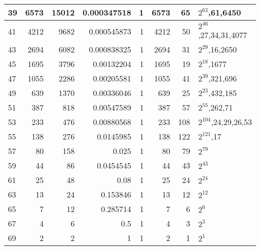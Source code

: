 \documentclass[10pt,a4paper]{standalone}
\begin{document}
\begin{tabular}{l|r|r|r|r|r|r|l|}
39 & 6573 & 15012 & 0.000347518 & 1 & 6573 & 65 & $2^{63}$,61,6450 \\ \hline
41 & 4212 & 9682 & 0.000545873 & 1 & 4212 & 50 & $2^{46}$,27,34,31,4077 \\ \hline
43 & 2694 & 6082 & 0.000838325 & 1 & 2694 & 31 & $2^{29}$,16,2650 \\ \hline
45 & 1695 & 3796 & 0.00132204 & 1 & 1695 & 19 & $2^{18}$,1677 \\ \hline
47 & 1055 & 2286 & 0.00205581 & 1 & 1055 & 41 & $2^{39}$,321,696 \\ \hline
49 & 639 & 1370 & 0.00336046 & 1 & 639 & 25 & $2^{23}$,432,185 \\ \hline
51 & 387 & 818 & 0.00547589 & 1 & 387 & 57 & $2^{55}$,262,71 \\ \hline
53 & 233 & 476 & 0.00880568 & 1 & 233 & 108 & $2^{104}$,24,29,26,53 \\ \hline
55 & 138 & 276 & 0.0145985 & 1 & 138 & 122 & $2^{121}$,17 \\ \hline
57 & 80 & 158 & 0.025 & 1 & 80 & 79 & $2^{79}$ \\ \hline
59 & 44 & 86 & 0.0454545 & 1 & 44 & 43 & $2^{43}$ \\ \hline
61 & 25 & 48 & 0.08 & 1 & 25 & 24 & $2^{24}$ \\ \hline
63 & 13 & 24 & 0.153846 & 1 & 13 & 12 & $2^{12}$ \\ \hline
65 & 7 & 12 & 0.285714 & 1 & 7 & 6 & $2^{6}$ \\ \hline
67 & 4 & 6 & 0.5 & 1 & 4 & 3 & $2^{3}$ \\ \hline
69 & 2 & 2 & 1 & 1 & 2 & 1 & $2^{1}$ \\ \hline
\end{tabular}
\end{document}
